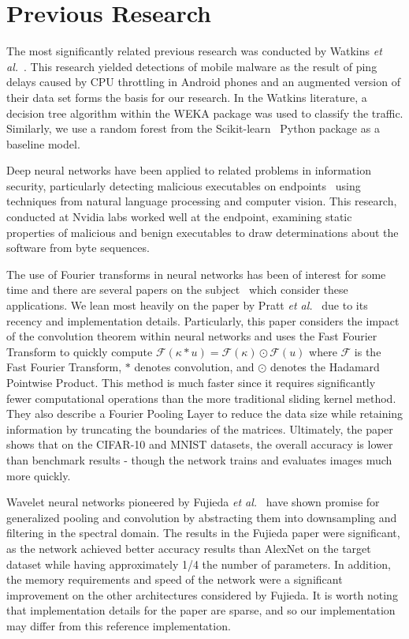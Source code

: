 \documentclass[10pt]{article}
\begin{document}
\section{Previous Research}
The most significantly related previous research was conducted by Watkins \textit{et al.}~\cite{watkins2018network}.
This research yielded detections of mobile malware as the result of ping delays caused by CPU throttling in Android phones and an augmented version of their data set forms the basis for our research.
In the Watkins literature, a decision tree algorithm within the WEKA package was used to classify the traffic.
Similarly, we use a random forest from the Scikit-learn~\cite{scikit-learn} Python package as a baseline model.

Deep neural networks have been applied to related problems in information security, particularly detecting malicious executables on endpoints~\cite{raff2018malware} using techniques from natural language processing and computer vision.
This research, conducted at Nvidia labs worked well at the endpoint, examining static properties of malicious and benign executables to draw determinations about the software from byte sequences.

The use of Fourier transforms in neural networks has been of interest for some time and there are several papers on the subject~\cite{osowski2002fourier, pratt2017fcnn, highlander2016very} which consider these applications.
We lean most heavily on the paper by Pratt \textit{et al.}~\cite{pratt2017fcnn} due to its recency and implementation details. 
Particularly, this paper considers the impact of the convolution theorem within neural networks and uses the Fast Fourier Transform to quickly compute $\mathcal{F}(\kappa * u) = \mathcal{F}(\kappa) \odot \mathcal{F}(u)$ where $\mathcal{F}$ is the Fast Fourier Transform, $*$ denotes convolution, and $\odot$ denotes the Hadamard Pointwise Product.
This method is much faster since it requires significantly fewer computational operations than the more traditional sliding kernel method.
They also describe a Fourier Pooling Layer to reduce the data size while retaining information by truncating the boundaries of the matrices.
Ultimately, the paper shows that on the CIFAR-10 and MNIST datasets, the overall accuracy is lower than benchmark results - though the network trains and evaluates images much more quickly.

Wavelet neural networks pioneered by Fujieda \textit{et al.}~\cite{fujieda2017wavelet} have shown promise for generalized pooling and convolution by abstracting them into downsampling and filtering in the spectral domain.
The results in the Fujieda paper were significant, as the network achieved better accuracy results than AlexNet on the target dataset while having approximately 1/4 the number of parameters.
In addition, the memory requirements and speed of the network were a significant improvement on the other architectures considered by Fujieda.
It is worth noting that implementation details for the paper are sparse, and so our implementation may differ from this reference implementation. 
\end{document}
